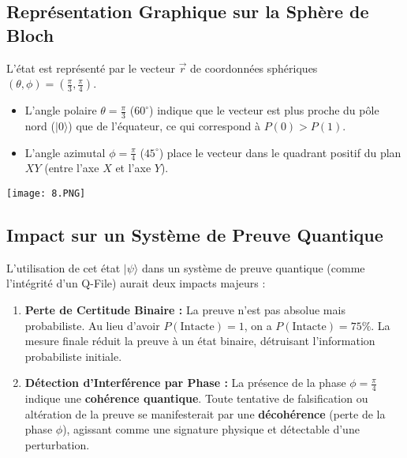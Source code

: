 \documentclass[12pt,a4paper]{report}
\begin{document}
\subsection*{Représentation Graphique sur la Sphère de Bloch}

L'état est représenté par le vecteur $\vec{r}$ de coordonnées sphériques $(\theta, \phi) = (\frac{\pi}{3}, \frac{\pi}{4})$.

\begin{itemize}
	\item L'angle polaire $\theta = \frac{\pi}{3}$ ($60^{\circ}$) indique que le vecteur est plus proche du pôle nord ($|0\rangle$) que de l'équateur, ce qui correspond à $P(0) > P(1)$.
	\item L'angle azimutal $\phi = \frac{\pi}{4}$ ($45^{\circ}$) place le vecteur dans le quadrant positif du plan $XY$ (entre l'axe $X$ et l'axe $Y$).
\end{itemize}

\texttt{[image: 8.PNG]}\\




\begin{center}
	
\end{center}

\subsection*{Impact sur un Système de Preuve Quantique}

L'utilisation de cet état $|\psi\rangle$ dans un système de preuve quantique (comme l'intégrité d'un Q-File) aurait deux impacts majeurs :

\begin{enumerate}
	\item \textbf{Perte de Certitude Binaire :} La preuve n'est pas absolue mais probabiliste. Au lieu d'avoir $P(\text{Intacte})=1$, on a $P(\text{Intacte}) = 75\%$. La mesure finale réduit la preuve à un état binaire, détruisant l'information probabiliste initiale.
	\item \textbf{Détection d'Interférence par Phase :} La présence de la phase $\phi = \frac{\pi}{4}$ indique une \textbf{cohérence quantique}. Toute tentative de falsification ou altération de la preuve se manifesterait par une \textbf{décohérence} (perte de la phase $\phi$), agissant comme une signature physique et détectable d'une perturbation.
\end{enumerate}
\end{document}
